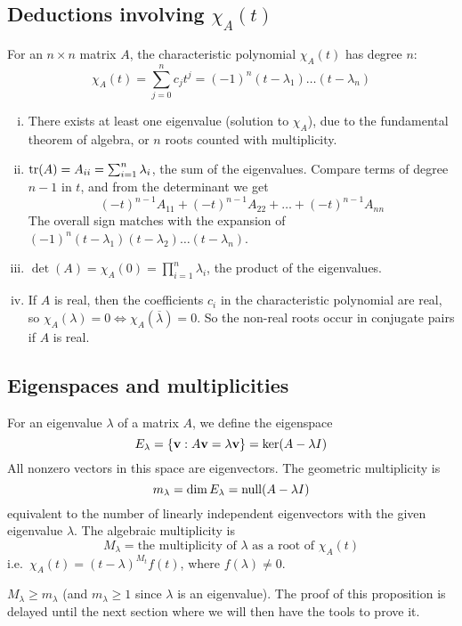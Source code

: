 \subsection{Deductions involving \(\chi_A(t)\)}
For an \(n \times n\) matrix \(A\), the characteristic polynomial \(\chi_A(t)\) has degree \(n\):
\[
	\chi_A(t) = \sum_{j = 0}^n c_j t^j = (-1)^n(t-\lambda_1)\dots(t-\lambda_n)
\]
\begin{enumerate}[(i)]
	\item There exists at least one eigenvalue (solution to \(\chi_A\)), due to the fundamental theorem of algebra, or \(n\) roots counted with multiplicity.
	\item \(\tr(A) = A_{ii} = \sum_{i=1}^n \lambda_i\), the sum of the eigenvalues.
	      Compare terms of degree \(n-1\) in \(t\), and from the determinant we get
	      \[
		      (-t)^{n-1}A_{11} + (-t)^{n-1}A_{22} + \dots + (-t)^{n-1}A_{nn}
	      \]
	      The overall sign matches with the expansion of \((-1)^n(t-\lambda_1)(t-\lambda_2)\dots(t-\lambda_n)\).
	\item \(\det(A) = \chi_A(0) = \prod_{i=1}^n \lambda_i\), the product of the eigenvalues.
	\item If \(A\) is real, then the coefficients \(c_i\) in the characteristic polynomial are real, so \(\chi_A(\lambda) = 0 \iff \chi_A(\overline\lambda) = 0\).
	      So the non-real roots occur in conjugate pairs if \(A\) is real.
\end{enumerate}

\subsection{Eigenspaces and multiplicities}
For an eigenvalue \(\lambda\) of a matrix \(A\), we define the eigenspace
\[
	E_\lambda = \{ \vb v : A \vb v = \lambda \vb v \} = \ker (A - \lambda I)
\]
All nonzero vectors in this space are eigenvectors.
The geometric multiplicity is
\[
	m_\lambda = \dim E_\lambda = \operatorname{null} (A - \lambda I)
\]
equivalent to the number of linearly independent eigenvectors with the given eigenvalue \(\lambda\).
The algebraic multiplicity is
\[
	M_\lambda = \text{the multiplicity of } \lambda \text{ as a root of } \chi_A(t)
\]
i.e.\ \(\chi_A(t) = (t - \lambda)^{M_t} f(t)\), where \(f(\lambda) \neq 0\).

\begin{proposition}
	\(M_\lambda \geq m_\lambda\) (and \(m_\lambda \geq 1\) since \(\lambda\) is an eigenvalue).
	The proof of this proposition is delayed until the next section where we will then have the tools to prove it.
\end{proposition}

